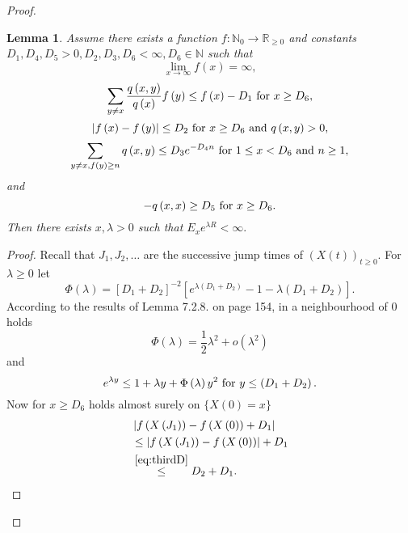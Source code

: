 \documentclass[12pt,a4paper]{scrartcl}
\newtheorem{lemma}[theorem]{Lemma}
\numberwithin{equation}{section}
\newcommand{\R}{\mathbb{R}} %
\newcommand{\N}{\mathbb{N}} %
\begin{document}
\begin{proof}
\begin{lemma}
Assume there exists a function $f: \N_0 \to \R_{\geq 0}$ and constants $D_1, D_4, D_5 > 0, D_2, D_3, D_6 < \infty, D_6 \in \N$ such that
\begin{equation}
\lim_{x \to \infty} f\left(x\right) = \infty,
\end{equation} 
\begin{equation} \label{eq:secondD}
\sum_{y \neq x} \frac{q\left(x,y\right)}{q\left(x\right)} f\left(y\right) \leq f\left(x\right) - D_1 \textnormal{ for } x \geq D_6,
\end{equation}
\begin{equation} \label{eq:thirdD}
\left|f\left(x\right) - f\left(y\right) \right| \leq D_2 \textnormal{ for } x \geq D_6 \textnormal{ and } q\left(x,y\right) > 0,
\end{equation}
\begin{equation} \label{eq:fourthD}
\sum_{y \neq x, f\left(y\right) \geq n} q\left(x,y\right) \leq D_3 e^{-D_4 n} \textnormal{ for } 1\leq x < D_6 \textnormal{ and } n \geq 1,
\end{equation}
and
\begin{equation}
-q\left(x,x\right) \geq D_5 \textnormal{ for } x \geq D_6.
\end{equation}
Then there exists $x, \lambda > 0$ such that $E_x e^{\lambda R} < \infty.$
\end{lemma}

\begin{proof}
Recall that $J_1, J_2, \ldots$ are the successive jump times of $\left(X\left(t\right) \right)_{t \geq 0}$. For $\lambda \geq 0$ let 
$$ \Phi\left(\lambda\right) = \left[D_1 + D_2 \right]^{-2} \left[e^{\lambda \left(D_1+D_2 \right)} -1 - \lambda\left(D_1 + D_2\right) \right]. $$
According to the results of \cite{neveu} Lemma 7.2.8. on page 154, in a neighbourhood of $0$ holds
\begin{equation} \label{eq:landauasymp}
\Phi\left(\lambda\right) = \frac{1}{2} \lambda^2  + o\left(\lambda^2\right)
\end{equation}
and
$$e^{\lambda y } \leq 1 + \lambda y + \Phi\left(\lambda\right) y^2 \textnormal{ for } y \leq \left(D_1+D_2\right).$$
Now for $x \geq D_6$ holds almost surely on $ \lbrace X\left(0\right) = x \rbrace $
\begin{align*}
&\left|f\left(X\left(J_1\right) \right) - f\left(X\left(0\right)\right) + D_1 \right| \\
&\leq \left|f\left(X\left(J_1\right) \right) - f\left(X\left(0\right)\right)\right| + D_1 \\
& \overset{ \eqref{eq:thirdD}}{\leq} D_2 + D_1.
\end{align*}


\end{proof}
\end{proof}
\end{document}

